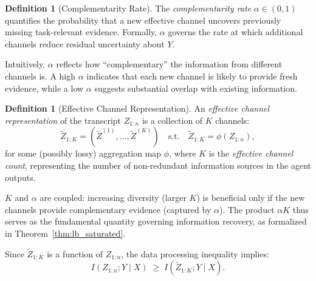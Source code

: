 \documentclass{article}
\theoremstyle{plain}
\theoremstyle{definition}
\newtheorem{definition}[theorem]{Definition}
\theoremstyle{remark}
\begin{document}
\begin{definition}[Complementarity Rate]
\label{def:alpha}
The \emph{complementarity rate} $\alpha \in (0,1)$ quantifies the probability that a new effective channel uncovers previously missing task-relevant evidence. Formally, $\alpha$ governs the rate at which additional channels reduce residual uncertainty about $Y$.
\end{definition}

Intuitively, $\alpha$ reflects how ``complementary'' the information from different channels is. A high $\alpha$ indicates that each new channel is likely to provide fresh evidence, while a low $\alpha$ suggests substantial overlap with existing information.

\begin{definition}[Effective Channel Representation]
\label{def:eff-ch}
An \emph{effective channel representation} of the transcript $Z_{1:n}$ is a collection of $K$ channels:
\begin{equation}
\tilde Z_{1:K}=(\tilde Z^{(1)},\ldots,\tilde Z^{(K)})
\quad\text{s.t.}\quad
\tilde Z_{1:K}=\phi(Z_{1:n}),
\label{eq:phi_def}
\end{equation}
for some (possibly lossy) aggregation map $\phi$, where $K$ is the \emph{effective channel count}, representing the number of non-redundant information sources in the agent outputs.
\end{definition}

$K$ and $\alpha$ are coupled: increasing diversity (larger $K$) is beneficial only if the new channels provide complementary evidence (captured by $\alpha$). The product $\alpha K$ thus serves as the fundamental quantity governing information recovery, as formalized in Theorem~\ref{thm:lb_saturated}.

Since $\tilde Z_{1:K}$ is a function of $Z_{1:n}$, the data processing inequality implies:
\begin{equation}
I(Z_{1:n};Y\mid X)\;\ge\; I(\tilde Z_{1:K};Y\mid X).
\label{eq:dpi}
\end{equation}
\end{document}
